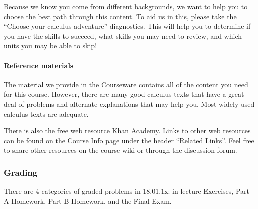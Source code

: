 \documentclass[pdftex, brazil, 12pt, twoside]{article}
\begin{document}
Because we know you come from different backgrounds, we want to help you to choose the best path through this content. To aid us in this, please take the ``Choose your calculus adventure'' diagnostics. This will help you to determine if you have the skills to succeed, what skills you may need to review, and which units you may be able to skip!

\paragraph{Reference materials}
The material we provide in the Courseware contains all of the content you need for this course. However, there are many good calculus texts that have a great deal of problems and alternate explanations that may help you. Most widely used calculus texts are adequate.

There is also the free web resource \href{https://www.khanacademy.org/}{Khan Academy}.
Links to other web resources can be found on the Course Info page under the header ``Related Links''. Feel free to share other resources on the course wiki or through the discussion forum.

\subsubsection{Grading}
\label{gs-ol-grading}

There are 4 categories of graded problems in 18.01.1x: in-lecture Exercises, Part A Homework, Part B Homework, and the Final Exam.
\end{document}
